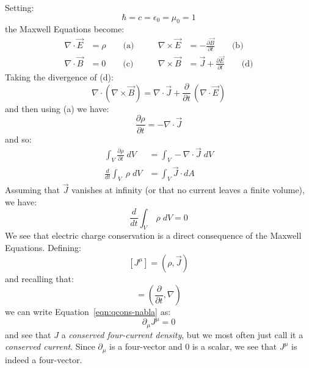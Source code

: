 \documentclass[12pt]{article}
\begin{document}
Setting:
$$\hbar = c = \epsilon_0 = \mu_0 = 1$$
the Maxwell Equations become:
\begin{equation}
\label{eqn:maxwell}
\begin{aligned}
\nabla \cdot \vec{E} &= \rho \qquad \text{(a)} \qquad &\nabla \times \vec{E} &= -\frac{\partial \vec{B}}{\partial t} \qquad \text{(b)}\\[6pt]
\nabla \cdot \vec{B} &= 0 \qquad \text{(c)} \qquad &\nabla \times \vec{B} &= \vec{J} + \frac{\partial \vec{E}}{\partial t} \qquad \text{(d)}
\end{aligned}
\end{equation}
Taking the divergence of (d):
\begin{equation*}
\nabla \cdot (\nabla \times \vec{B}) = \nabla \cdot \vec{J} + \frac{\partial}{\partial t} \, (\nabla \cdot \vec{E}) 
\end{equation*}
and then using (a) we have:
\begin{equation}
  \label{eqn:qcons-nabla}
\frac{\partial \rho}{\partial t} =  -\nabla \cdot \vec{J} 
\end{equation}
and so:
\begin{align*}
  \int_V \frac{\partial \rho}{\partial t} \; dV &=  \int_V -\nabla \cdot \vec{J} \; dV \\[7pt]
  \frac{d}{dt} \int_V \; \rho \; dV &=  \int_V \vec{J} \cdot dA 
\end{align*}
Assuming that $\vec{J}$ vanishes at infinity (or that no current leaves a finite volume), we have:
\begin{equation}
  \frac{d}{dt} \int_V \; \rho \; dV =  0 
\end{equation}
We see that electric charge conservation is a direct consequence of the Maxwell Equations.
Defining:
\begin{equation}
\label{eqn:four-current}  
[J^\mu] = (\rho, \vec{J})
\end{equation}
and recalling that:
\begin{equation*}
[\partial_\mu] = (\frac{\partial}{\partial t}, \nabla)
\end{equation*}
we can write Equation~\ref{eqn:qcons-nabla} as:
\begin{equation}
\label{eqn:conserved-four-current}
\partial_\mu J^\mu = 0
\end{equation}
and see that $J$ a {\it conserved four-current density}, but we most
often just call it a {\it conserved current}.  Since $\partial_\mu$ is
a four-vector and $0$ is a scalar, we see that $J^\mu$ is indeed a
four-vector.\\[5pt]
\end{document}
